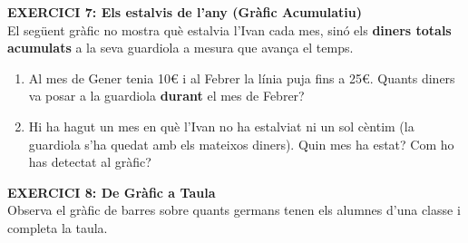 \documentclass[12pt,a4paper]{article}
\begin{document}
\noindent \textbf{EXERCICI 7: Els estalvis de l'any (Gràfic Acumulatiu)} \\
El següent gràfic no mostra què estalvia l'Ivan cada mes, sinó els \textbf{diners totals acumulats} a la seva guardiola a mesura que avança el temps.

\begin{center}
\end{center}

\begin{enumerate}[label=\alph*)]
    \item Al mes de Gener tenia 10€ i al Febrer la línia puja fins a 25€. Quants diners va posar a la guardiola \textbf{durant} el mes de Febrer?
    \vspace{0.6cm}
    \item Hi ha hagut un mes en què l'Ivan no ha estalviat ni un sol cèntim (la guardiola s'ha quedat amb els mateixos diners). Quin mes ha estat? Com ho has detectat al gràfic?
    \vspace{0.6cm}
\end{enumerate}

\noindent \textbf{EXERCICI 8: De Gràfic a Taula} \\
Observa el gràfic de barres sobre quants germans tenen els alumnes d'una classe i completa la taula.
\end{document}
